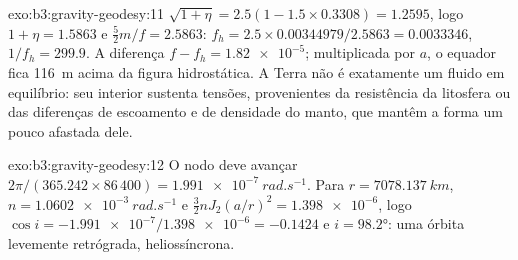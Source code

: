 \begin{solution}{exo:b3:gravity-geodesy:11}
$\sqrt{1 + \eta} = 2.5(1 - 1.5\times0.3308) = 1.2595$, logo $1 + \eta = 1.5863$
e $\tfrac52m/f = 2.5863$: $f_h = 2.5\times0.00344979/2.5863 = \num{0.0033346}$,
$1/f_h = 299.9$. A diferença $f - f_h = \num{1.82e-5}$; multiplicada por $a$, o
equador fica \qty{116}{m} acima da figura hidrostática. A Terra não é exatamente
um fluido em equilíbrio: seu interior sustenta tensões, provenientes da resistência da
litosfera ou das diferenças de escoamento e de densidade do manto, que mantêm
a forma um pouco afastada dele.
\end{solution}

\begin{solution}{exo:b3:gravity-geodesy:12}
O nodo deve avançar $2\pi/(365.242\times86\,400) =
\qty{1.991e-7}{rad.s^{-1}}$. Para $r = \qty{7078.137}{km}$, $n =
\qty{1.0602e-3}{rad.s^{-1}}$ e $\tfrac32nJ_2(a/r)^2 = \num{1.398e-6}$, logo
$\cos i = -\num{1.991e-7}/\num{1.398e-6} = -0.1424$ e $i = \ang{98.2}$: uma
órbita levemente retrógrada, heliossíncrona.
\end{solution}

